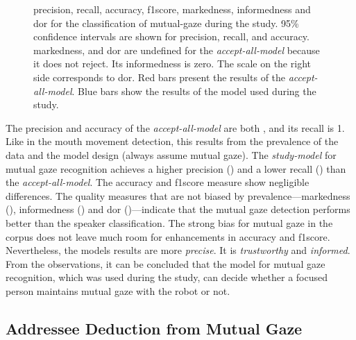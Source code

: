 \begin{figure}[htb]
    \centering
    
    \vspace{-25pt}
    \caption[Mutual gaze recognition performance.]{\label{fig:meka-perf-gaze}
    \Gls{precision}, \gls{recall}, \gls{accuracy}, \gls{f1score}, \gls{markedness}, \gls{informedness} and \gls{dor} for the classification of mutual-gaze during the study.
    95\% confidence intervals are shown for \gls{precision}, \gls{recall}, and \gls{accuracy}.
    \Gls{markedness}, and \gls{dor} are undefined for the \emph{accept-all-model} because it does not reject.
    Its \gls{informedness} is zero.
    The scale on the right side corresponds to \gls{dor}.
    Red bars present the results of the \emph{accept-all-model}.
    Blue bars show the results of the model used during the study.
    }
\end{figure}
The \gls{precision} and \gls{accuracy} of the \emph{accept-all-model} are both , and its \gls{recall} is 1.
Like in the mouth movement detection, this results from the \gls{prevalence} of the data and the model design (always assume mutual gaze).
The \emph{study-model} for mutual gaze recognition achieves a higher \gls{precision} () and a lower \gls{recall} () than the \emph{accept-all-model}.
The \gls{accuracy} and \gls{f1score} measure show negligible differences.
The quality measures that are not biased by \gls{prevalence}---\gls{markedness} (), \gls{informedness} () and \gls{dor} ()---indicate that the mutual gaze detection performs better than the \gls{speaker} classification.
The strong bias for mutual gaze in the corpus does not leave much room for enhancements in \gls{accuracy} and \gls{f1score}.
Nevertheless, the models results are more \emph{precise}.
It is \emph{trustworthy} and \emph{informed}.
From the observations, it can be concluded that the model for mutual gaze recognition, which was used during the study, can decide whether a focused person maintains mutual gaze with the \gls{robot} or not.

\subsection{Addressee Deduction from Mutual Gaze}

